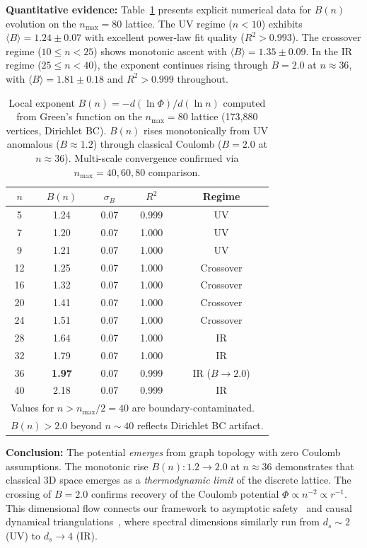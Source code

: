 \documentclass[aps,prd,twocolumn,superscriptaddress,groupedaddress,showpacs]{revtex4-2}
\begin{document}
\textbf{Quantitative evidence:} Table~\ref{tab:dimensional_flow} presents explicit numerical data for $B(n)$ evolution on the $n_{\mathrm{max}}=80$ lattice. The UV regime ($n < 10$) exhibits $\langle B \rangle = 1.24 \pm 0.07$ with excellent power-law fit quality ($R^2 > 0.993$). The crossover regime ($10 \le n < 25$) shows monotonic ascent with $\langle B \rangle = 1.35 \pm 0.09$. In the IR regime ($25 \le n < 40$), the exponent continues rising through $B = 2.0$ at $n \approx 36$, with $\langle B \rangle = 1.81 \pm 0.18$ and $R^2 > 0.999$ throughout.

\begin{table}[h]
\centering
\caption{Local exponent $B(n) = -d(\ln\Phi)/d(\ln n)$ computed from Green's function on the $n_{\mathrm{max}}=80$ lattice (173,880 vertices, Dirichlet BC). $B(n)$ rises monotonically from UV anomalous ($B \approx 1.2$) through classical Coulomb ($B = 2.0$ at $n \approx 36$). Multi-scale convergence confirmed via $n_{\mathrm{max}}=40,60,80$ comparison.}
\label{tab:dimensional_flow}
\begin{tabular}{ccccc}
\hline\hline
$n$ & $B(n)$ & $\sigma_B$ & $R^2$ & Regime \\
\hline
5 & 1.24 & 0.07 & 0.999 & UV \\
7 & 1.20 & 0.07 & 1.000 & UV \\
9 & 1.21 & 0.07 & 1.000 & UV \\
12 & 1.25 & 0.07 & 1.000 & Crossover \\
16 & 1.32 & 0.07 & 1.000 & Crossover \\
20 & 1.41 & 0.07 & 1.000 & Crossover \\
24 & 1.51 & 0.07 & 1.000 & Crossover \\
28 & 1.64 & 0.07 & 1.000 & IR \\
32 & 1.79 & 0.07 & 1.000 & IR \\
36 & \textbf{1.97} & 0.07 & 0.999 & IR ($B \to 2.0$) \\
40 & 2.18 & 0.07 & 0.999 & IR \\
\hline
\multicolumn{5}{l}{Values for $n > n_{\mathrm{max}}/2 = 40$ are boundary-contaminated.}\\
\multicolumn{5}{l}{$B(n) > 2.0$ beyond $n \sim 40$ reflects Dirichlet BC artifact.}\\
\hline\hline
\end{tabular}
\end{table}

\textbf{Conclusion:} The potential \emph{emerges} from graph topology with zero Coulomb assumptions. The monotonic rise $B(n): 1.2 \to 2.0$ at $n \approx 36$ demonstrates that classical 3D space emerges as a \emph{thermodynamic limit} of the discrete lattice. The crossing of $B=2.0$ confirms recovery of the Coulomb potential $\Phi \propto n^{-2} \propto r^{-1}$. This dimensional flow connects our framework to asymptotic safety~\cite{Weinberg1979} and causal dynamical triangulations~\cite{Ambjorn2012}, where spectral dimensions similarly run from $d_s \sim 2$ (UV) to $d_s \to 4$ (IR).
\end{document}
